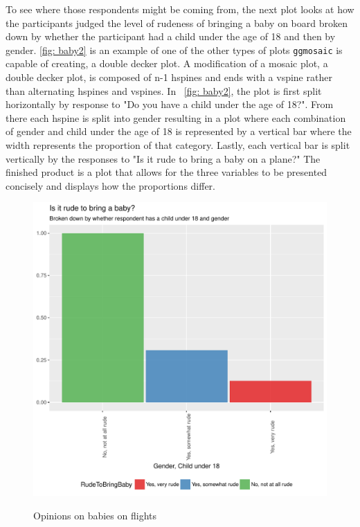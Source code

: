 \documentclass[DIV=calc, paper=a4, fontsize=10pt, twocolumn]{scrartcl}	 %
\begin{document}
\par To see where those respondents might be coming from, the next plot looks at how the participants judged the level of rudeness of bringing a baby on board broken down by whether the participant had a child under the age of 18 and then by gender. \ref{fig: baby2} is an example of one of the other types of plots \texttt{ggmosaic} is capable of creating, a double decker plot. A modification of a mosaic plot, a double decker plot, is composed of n-1 hspines and ends with a vspine rather than alternating hspines and vspines. In ~\ref{fig: baby2}, the plot is first split horizontally by response to "Do you have a child under the age of 18?". From there each hspine is split into gender resulting in a plot where each combination of gender and child under the age of 18 is represented by a vertical bar where the width represents the proportion of that category. Lastly, each vertical bar is split vertically by the responses to "Is it rude to bring a baby on a plane?" The finished product is a plot that allows for the three variables to be presented concisely and displays how the proportions differ.


\begin{figure}[h!]
\caption{Opinions on babies on flights}
\centering
\includegraphics{flying-baby}
\label{fig: baby}
\end{figure}
\end{document}
